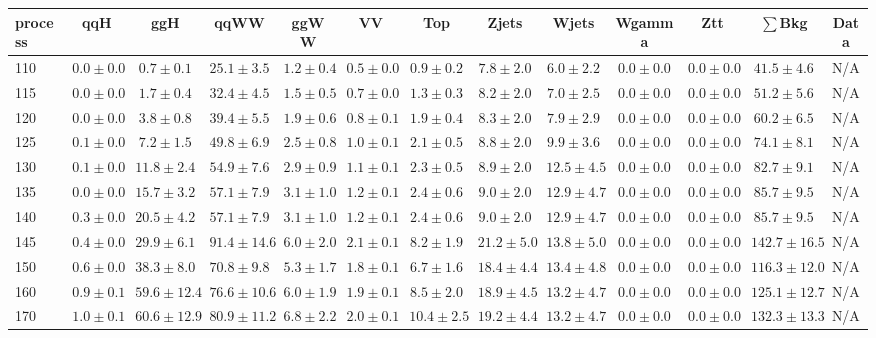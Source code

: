\begin{table}
{%
 \tiny
 \begin{center}
 \begin{tabular}{l | c c | c c c c c c c c  | c c}
 \hline
 process & qqH & ggH & qqWW & ggWW & VV & Top & Zjets & Wjets & Wgamma & Ztt & $\sum$Bkg & Data \\
 \hline
110 & $0.0\pm0.0$ & $0.7\pm0.1$ & $25.1\pm3.5$ & $1.2\pm0.4$ & $0.5\pm0.0$ & $0.9\pm0.2$ & $7.8\pm2.0$ & $6.0\pm2.2$ & $0.0\pm0.0$ & $0.0\pm0.0$ & $41.5\pm4.6$ & N/A \\
115 & $0.0\pm0.0$ & $1.7\pm0.4$ & $32.4\pm4.5$ & $1.5\pm0.5$ & $0.7\pm0.0$ & $1.3\pm0.3$ & $8.2\pm2.0$ & $7.0\pm2.5$ & $0.0\pm0.0$ & $0.0\pm0.0$ & $51.2\pm5.6$ & N/A \\
120 & $0.0\pm0.0$ & $3.8\pm0.8$ & $39.4\pm5.5$ & $1.9\pm0.6$ & $0.8\pm0.1$ & $1.9\pm0.4$ & $8.3\pm2.0$ & $7.9\pm2.9$ & $0.0\pm0.0$ & $0.0\pm0.0$ & $60.2\pm6.5$ & N/A \\
125 & $0.1\pm0.0$ & $7.2\pm1.5$ & $49.8\pm6.9$ & $2.5\pm0.8$ & $1.0\pm0.1$ & $2.1\pm0.5$ & $8.8\pm2.0$ & $9.9\pm3.6$ & $0.0\pm0.0$ & $0.0\pm0.0$ & $74.1\pm8.1$ & N/A \\
130 & $0.1\pm0.0$ & $11.8\pm2.4$ & $54.9\pm7.6$ & $2.9\pm0.9$ & $1.1\pm0.1$ & $2.3\pm0.5$ & $8.9\pm2.0$ & $12.5\pm4.5$ & $0.0\pm0.0$ & $0.0\pm0.0$ & $82.7\pm9.1$ & N/A \\
135 & $0.0\pm0.0$ & $15.7\pm3.2$ & $57.1\pm7.9$ & $3.1\pm1.0$ & $1.2\pm0.1$ & $2.4\pm0.6$ & $9.0\pm2.0$ & $12.9\pm4.7$ & $0.0\pm0.0$ & $0.0\pm0.0$ & $85.7\pm9.5$ & N/A \\
140 & $0.3\pm0.0$ & $20.5\pm4.2$ & $57.1\pm7.9$ & $3.1\pm1.0$ & $1.2\pm0.1$ & $2.4\pm0.6$ & $9.0\pm2.0$ & $12.9\pm4.7$ & $0.0\pm0.0$ & $0.0\pm0.0$ & $85.7\pm9.5$ & N/A \\
145 & $0.4\pm0.0$ & $29.9\pm6.1$ & $91.4\pm14.6$ & $6.0\pm2.0$ & $2.1\pm0.1$ & $8.2\pm1.9$ & $21.2\pm5.0$ & $13.8\pm5.0$ & $0.0\pm0.0$ & $0.0\pm0.0$ & $142.7\pm16.5$ & N/A \\
150 & $0.6\pm0.0$ & $38.3\pm8.0$ & $70.8\pm9.8$ & $5.3\pm1.7$ & $1.8\pm0.1$ & $6.7\pm1.6$ & $18.4\pm4.4$ & $13.4\pm4.8$ & $0.0\pm0.0$ & $0.0\pm0.0$ & $116.3\pm12.0$ & N/A \\
160 & $0.9\pm0.1$ & $59.6\pm12.4$ & $76.6\pm10.6$ & $6.0\pm1.9$ & $1.9\pm0.1$ & $8.5\pm2.0$ & $18.9\pm4.5$ & $13.2\pm4.7$ & $0.0\pm0.0$ & $0.0\pm0.0$ & $125.1\pm12.7$ & N/A \\
170 & $1.0\pm0.1$ & $60.6\pm12.9$ & $80.9\pm11.2$ & $6.8\pm2.2$ & $2.0\pm0.1$ & $10.4\pm2.5$ & $19.2\pm4.4$ & $13.2\pm4.7$ & $0.0\pm0.0$ & $0.0\pm0.0$ & $132.3\pm13.3$ & N/A \\

\end{tabular}
\end{center}}
\end{table}
